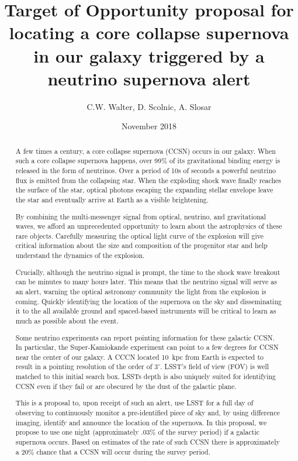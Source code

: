 \documentclass[12pt, letterpaper]{article}
\title{Target of Opportunity proposal for locating a core collapse
  supernova in our galaxy triggered by a neutrino supernova alert}
\author{ C.W. Walter, D. Scolnic, A. Slosar}
\date{ November 2018}
\begin{document}
\maketitle

\begin{abstract}

  A few times a century, a core collapse supernova (CCSN) occurs in our
  galaxy. When such a core collapse supernova happens, over 99\%
  of its gravitational binding energy is released in the form of
  neutrinos.  Over a period of 10s of seconds a powerful neutrino flux
  is emitted from the collapsing star.  When the exploding shock wave
  finally reaches the surface of the star, optical photons escaping
  the expanding stellar envelope leave the star and eventually arrive at
  Earth as a visible brightening.

  By combining the multi-messenger signal from optical, neutrino, and
  gravitational waves, we afford an unprecedented opportunity to learn
  about the astrophysics of these rare objects. Carefully measuring
  the optical light curve of the explosion will give critical
  information about the size and composition of the progenitor star
  and help understand the dynamics of the explosion.

  Crucially, although the neutrino signal is prompt, the time to the
  shock wave breakout can be minutes to many hours later.  This means
  that the neutrino signal will serve as an alert, warning the
  optical astronomy community the light from the explosion is coming.  
  Quickly identifying the location of the supernova on the sky and
  disseminating it to the all available ground and spaced-based
  instruments will be critical to learn as much as possible about the
  event.

  Some neutrino experiments can report pointing information for these
  galactic CCSN. In particular, the Super-Kamiokande experiment can
  point to a few degrees for CCSN near the center of our galaxy.  A
  CCCN located 10~kpc from Earth is expected to result in a pointing
  resolution of the order of $3^\circ$.  LSST's field of view (FOV) is
  well matched to this initial search box.  LSSTs depth is also
  uniquely suited for identifying CCSN even if they fail or are
  obscured by the dust of the galactic plane.

  This is a proposal to, upon receipt of such an alert, use LSST for
 a full day of observing to continuously monitor a pre-identified
  piece of sky and, by using difference imaging, identify and announce
  the location of the supernova. In this proposal, we propose to use one
  night (approximately .03\% of the survey period) if a galactic
  supernova occurs.  Based on estimates of the rate of such CCSN there
  is approximately a 20\% chance that a CCSN will occur during the
  survey period.
  
\end{abstract}
\end{document}
